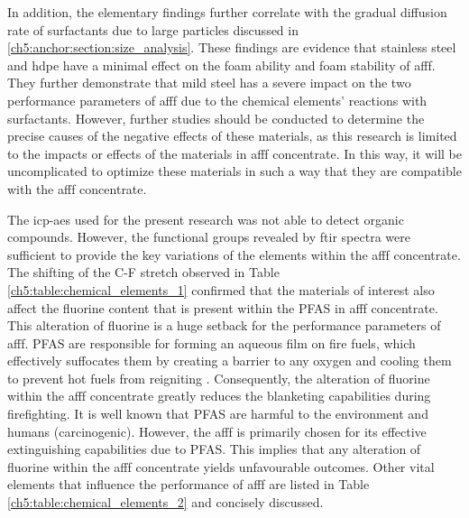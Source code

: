 In addition, the elementary findings further correlate with the gradual diffusion rate of surfactants due to large particles discussed in \ref{ch5:anchor:section:size_analysis}. These findings are evidence that stainless steel and \acrshort{hdpe} have a minimal effect on the foam ability and foam stability of \acrshort{afff}. They further demonstrate that mild steel has a severe impact on the two performance parameters of \acrshort{afff} due to the chemical elements’ reactions with surfactants. However, further studies should be conducted to determine the precise causes of the negative effects of these materials, as this research is limited to the impacts or effects of the materials in \acrshort{afff} concentrate. In this way, it will be uncomplicated to optimize these materials in such a way that they are compatible with the \acrshort{afff} concentrate.

The \acrshort{icp-aes} used for the present research was not able to detect organic compounds. However, the functional groups revealed by \acrshort{ftir} spectra were sufficient to provide the key variations of the elements within the \acrshort{afff} concentrate. The shifting of the C-F stretch observed in Table \ref{ch5:table:chemical_elements_1} confirmed that the materials of interest also affect the fluorine content that is present within the PFAS in \acrshort{afff} concentrate. This alteration of fluorine is a huge setback for the performance parameters of \acrshort{afff}. PFAS are responsible for forming an aqueous film on fire fuels, which effectively suffocates them by creating a barrier to any oxygen and cooling them to prevent hot fuels from reigniting \cite{hinnant2020characterizing}. Consequently, the alteration of fluorine within the \acrshort{afff} concentrate greatly reduces the blanketing capabilities during firefighting. It is well known that PFAS are harmful to the environment and humans (carcinogenic). However, the \acrshort{afff} is primarily chosen for its effective extinguishing capabilities due to PFAS. This implies that any alteration of fluorine within the \acrshort{afff} concentrate yields unfavourable outcomes. Other vital elements that influence the performance of \acrshort{afff} are listed in Table \ref{ch5:table:chemical_elements_2} and concisely discussed.

